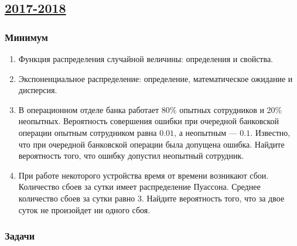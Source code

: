 \newpage
\subsection[2017-2018]{\hyperref[sec:sol_kr_01_2017_2018]{2017-2018}}
\label{sec:kr_01_2017_2018} %

\subsubsection*{Минимум}

\begin{enumerate}
\item Функция распределения случайной величины: определения и свойства.
\item Экспоненциальное распределение: определение, математическое ожидание и дисперсия.
\item В операционном отделе банка работает 80\% опытных сотрудников и 20\% неопытных. Вероятность совершения ошибки при очередной банковской операции опытным сотрудником равна $0.01$, а неопытным — $0.1$. Известно, что при очередной банковской операции была допущена ошибка. Найдите вероятность того, что ошибку допустил неопытный сотрудник.
\item При работе некоторого устройства время от времени возникают сбои. Количество сбоев за сутки имеет распределение Пуассона. Среднее количество сбоев за сутки равно 3. Найдите вероятность того, что за двое суток не произойдет ни одного сбоя.

\end{enumerate}

\subsubsection*{Задачи}

